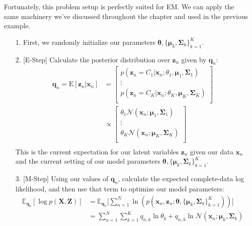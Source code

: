 Fortunately, this problem setup is perfectly suited for EM. We can apply the same machinery we've discussed throughout the chapter and used in the previous example.
\begin{itemize}
    \item[1.] First, we randomly initialize our parameters $\boldsymbol{\theta}, \{ \boldsymbol{\mu}_k, \boldsymbol{\Sigma}_k \}_{k=1}^{K}$.
    \item[2.] [E-Step] Calculate the posterior distribution over $\textbf{z}_n$ given by $\textbf{q}_n$:
        \begin{align*}
            \textbf{q}_n = \mathrm{E}[\textbf{z}_n | \textbf{x}_n] &= \begin{bmatrix}
                p(\textbf{z}_n = C_1 | \textbf{x}_n; \theta_1, \boldsymbol{\mu}_1, \boldsymbol{\Sigma}_1) \\
                \vdots \\
                p(\textbf{z}_n = C_K | \textbf{x}_n; \theta_K, \boldsymbol{\mu}_K, \boldsymbol{\Sigma}_K) \\
            \end{bmatrix} \\
            &\propto \begin{bmatrix}
                \theta_1 \mathcal{N}(\textbf{x}_n; \boldsymbol{\mu}_1, \boldsymbol{\Sigma}_1) \\
                \vdots \\
                \theta_K \mathcal{N}(\textbf{x}_n; \boldsymbol{\mu}_K, \boldsymbol{\Sigma}_K) \\
            \end{bmatrix} \\
        \end{align*}
        This is the current expectation for our latent variables $\textbf{z}_n$ given our data $\textbf{x}_n$ and the current setting of our model parameters $\boldsymbol{\theta}, \{ \boldsymbol{\mu}_k, \boldsymbol{\Sigma}_k \}_{k=1}^{K}$.
    \item[3.] [M-Step] Using our values of $\textbf{q}_n$, calculate the expected complete-data log likelihood, and then use that term to optimize our model parameters:
        \begin{align*}
            \mathbb{E}_{\textbf{q}_n}[\log p(\textbf{X}, \textbf{Z})] &= \mathbb{E}_{\textbf{q}_n} \bigg[ \sum_{n=1}^{N} \ln(p(\textbf{x}_n, \textbf{z}_n; \boldsymbol{\theta}, \{ \boldsymbol{\mu}_k, \boldsymbol{\Sigma}_k \}_{k=1}^{K})) \bigg] \\
            &= \sum_{n=1}^{N} \sum_{k=1}^{K} q_{n, k} \ln \theta_k + q_{n, k} \ln \mathcal{N}(\textbf{x}_n; \boldsymbol{\mu}_k, \boldsymbol{\Sigma}_k) \\

\end{align*}
\end{itemize}
